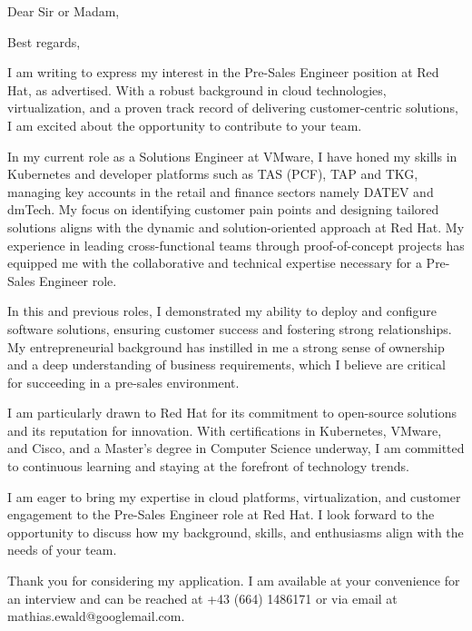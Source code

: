 \documentclass[11pt,a4paper,sans]{moderncv}
\begin{document}
  
 
\clearpage
\date{February 16, 2024}
\subject{Job Application}
\opening{Dear Sir or Madam,}
\closing{Best regards,}
\makelettertitle

I am writing to express my interest in the Pre-Sales Engineer position at Red
Hat, as advertised. With a robust background in cloud technologies,
virtualization, and a proven track record of delivering customer-centric
solutions, I am excited about the opportunity to contribute to your team.

In my current role as a Solutions Engineer at VMware, I have honed my skills in
Kubernetes and developer platforms such as TAS (PCF), TAP and TKG, managing key
accounts in the retail and finance sectors namely DATEV and dmTech. My focus on
identifying customer pain points and designing tailored solutions aligns with
the dynamic and solution-oriented approach at Red Hat. My experience in leading
cross-functional teams through proof-of-concept projects has equipped me with
the collaborative and technical expertise necessary for a Pre-Sales Engineer
role.

In this and previous roles, I demonstrated my ability to deploy and configure
software solutions, ensuring customer success and fostering strong
relationships. My entrepreneurial background has instilled in me a strong sense
of ownership and a deep understanding of business requirements, which I believe
are critical for succeeding in a pre-sales environment.

I am particularly drawn to Red Hat for its commitment to open-source solutions
and its reputation for innovation. With certifications in Kubernetes, VMware,
and Cisco, and a Master's degree in Computer Science underway, I am committed to
continuous learning and staying at the forefront of technology trends.

I am eager to bring my expertise in cloud platforms, virtualization, and
customer engagement to the Pre-Sales Engineer role at Red Hat. I look forward to
the opportunity to discuss how my background, skills, and enthusiasms align with
the needs of your team.

Thank you for considering my application. I am available at your convenience for
an interview and can be reached at +43 (664) 1486171 or via email at
mathias.ewald@googlemail.com.

\hbox{}\hbox{}

\makeletterclosing
\end{document}
